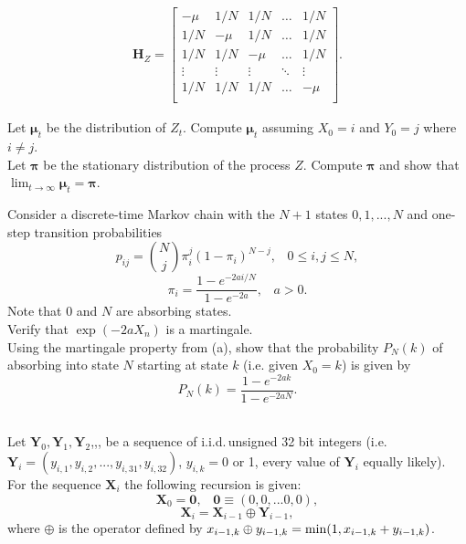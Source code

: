 \documentclass[10pt]{amsart}
\begin{document}
\begin{align*}
\bm H_Z = 
\begin{bmatrix}
- \mu & 1/N & 1/N & \dots & 1/N \\
1/N & - \mu & 1/N & \dots & 1/N \\
1/N & 1/N & - \mu & \dots & 1/N \\
\vdots & \vdots & \vdots & \ddots & \vdots \\
1/N & 1/N & 1/N & \dots & - \mu \\
\end{bmatrix}.
\end{align*}


 Let ${\bm \mu}_t$ be the distribution of $Z_t$. Compute  ${\bm \mu}_t$ assuming $X_0=i$ and $Y_0=j$ where $i\neq j$.
\\

 Let ${\bm \pi}$ be the stationary distribution of the process $Z$. Compute ${\bm \pi}$  and show that $\lim_{t\to\infty}{\bm \mu}_t={\bm \pi}$. 
\\

\newpage

 Consider a discrete-time Markov chain with the $N+1$ states $0,1,...,N$ and one-step transition probabilities
$$p_{ij}={N \choose j} \pi_i^j (1-\pi_i)^{N-j},  \,\,\,\,\, 0\leq i, j\leq N,$$ 
$$\pi_i=\frac{1-e^{-2ai/N}}{1-e^{-2a}}, \,\,\,\,\, a>0.$$
Note that $0$ and $N$ are absorbing states. 
\\

  Verify that $\exp(-2aX_n)$ is a martingale.
\\

  Using the martingale property from (a), show that the probability $P_N(k)$ of absorbing into state $N$ starting at state $k$ (i.e. given $X_0=k$) is given by
$$P_N(k)=\frac{1-e^{-2ak}}{1-e^{-2aN}}.$$
\\

\newpage

 Let ${\bm Y}_0, {\bm Y}_1, {\bm Y}_2$,,, be a sequence of i.i.d.\,unsigned 32 bit integers (i.e. ${\bm Y}_i=(y_{i,1},y_{i,2},...,y_{i,31},y_{i,32})$, $y_{i,k}=0$ or 1, every value of ${\bm Y}_i$ equally likely).
\\

\noindent For the sequence ${\bm X}_i$ the following recursion is given:
$${\bm X}_0={\bm 0}, \,\,\,\,\, {\bm 0}\equiv(0,0,...0,0),$$
$${\bm X}_i={\bm X}_{i-1} \oplus {\bm Y}_{i-1},$$
where $\oplus$ is the operator defined by $x_{i-1,k} \oplus y_{i-1,k}={\rm min}(1,x_{i-1,k}+y_{i-1,k})$.
\\
\end{document}
